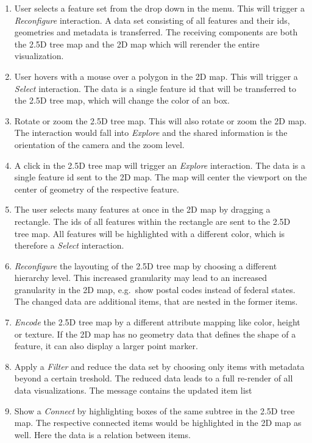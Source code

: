 \documentclass{article}
\newcommand{\map}{\textsc{2D} map}
\newcommand{\tmap}{\textsc{2.5D} tree map}
\begin{document}
    \begin{enumerate}
      \item
        User selects a feature set from the drop down in the menu. This will trigger a \emph{Reconfigure} interaction. A data set consisting of all features and their ids, geometries and metadata is transferred. The receiving components are both the \tmap{} and the \map{} which will rerender the entire visualization.
      \item
        User hovers with a mouse over a polygon in the \map{}. This will trigger a \emph{Select} interaction. The data is a single feature id that will be transferred to the \tmap{}, which will change the color of an box.
      \item
        Rotate or zoom the \tmap{}. This will also rotate or zoom the \map{}. The interaction would fall into \emph{Explore} and the shared information is the orientation of the camera and the zoom level.
      \item
        A click in the \tmap{} will trigger an \emph{Explore} interaction. The data is a single feature id sent to the \map{}. The map will center the viewport on the center of geometry of the respective feature.
      \item
        The user selects many features at once in the \map{} by dragging a rectangle. The ids of all features within the rectangle are sent to the \tmap{}. All features will be highlighted with a different color, which is therefore a \emph{Select} interaction.
      \item
        \emph{Reconfigure} the layouting of the \tmap{} by choosing a different hierarchy level. This increased granularity may lead to an increased granularity in the \map{}, e.g.\ show postal codes instead of federal states. The changed data are additional items, that are nested in the former items.
      \item
        \emph{Encode} the \tmap{} by a different attribute mapping like color, height or texture. If the \map{} has no geometry data that defines the shape of a feature, it can also display a larger point marker.
      \item
        Apply a \emph{Filter} and reduce the data set by choosing only items with metadata beyond a certain treshold. The reduced data leads to a full re-render of all data visualizations. The message contains the updated item list
  \item
    Show a \emph{Connect} by highlighting boxes of the same subtree in the \tmap{}. The respective connected items would be highlighted in the \map{} as well. Here the data is a relation between items.
    \end{enumerate}
\end{document}
